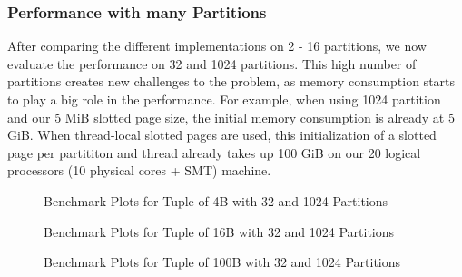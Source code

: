\subsubsection{Performance with many Partitions}
After comparing the different implementations on 2 - 16 partitions, we now evaluate the performance on 32 and 1024 partitions.
This high number of partitions creates new challenges to the problem, as memory consumption starts to play a big role in the performance.
For example, when using 1024 partition and our 5 MiB slotted page size, the initial memory consumption is already at 5 GiB.
When thread-local slotted pages are used, this initialization of a slotted page per partititon and thread already takes up 100 GiB on our 20 logical processors (10 physical cores + SMT) machine.

\begin{figure}[h]
  \centering
  \begin{subfigure}{.49\textwidth}
    \centering
    \resizebox{\linewidth}{!}{}
  \end{subfigure}
  \begin{subfigure}{.49\textwidth}
    \centering
    \resizebox{\linewidth}{!}{}
  \end{subfigure}
  \caption[Shuffle Benchmark Plots for Tuple of 4B with 32 and 1024 Partitions]{Benchmark Plots for Tuple of 4B with 32 and 1024 Partitions}
  \label{plot-shuffle-4B-32-1024}
\end{figure}

\begin{figure}[h]
  \centering
  \begin{subfigure}{.49\textwidth}
    \centering
    \resizebox{\linewidth}{!}{}
  \end{subfigure}
  \begin{subfigure}{.49\textwidth}
    \centering
    \resizebox{\linewidth}{!}{}
  \end{subfigure}
  \caption[Shuffle Benchmark Plots for Tuple of 16B with 32 and 1024 Partitions]{Benchmark Plots for Tuple of 16B with 32 and 1024 Partitions}
  \label{plot-shuffle-16B-32-1024}
\end{figure}

\begin{figure}[h]
  \centering
  \begin{subfigure}{.49\textwidth}
    \centering
    \resizebox{\linewidth}{!}{}
  \end{subfigure}
  \begin{subfigure}{.49\textwidth}
    \centering
    \resizebox{\linewidth}{!}{}
  \end{subfigure}
  \caption[Shuffle Benchmark Plots for Tuple of 100B with 32 and 1024 Partitions]{Benchmark Plots for Tuple of 100B with 32 and 1024 Partitions}
  \label{plot-shuffle-100B-32-1024}
\end{figure}

